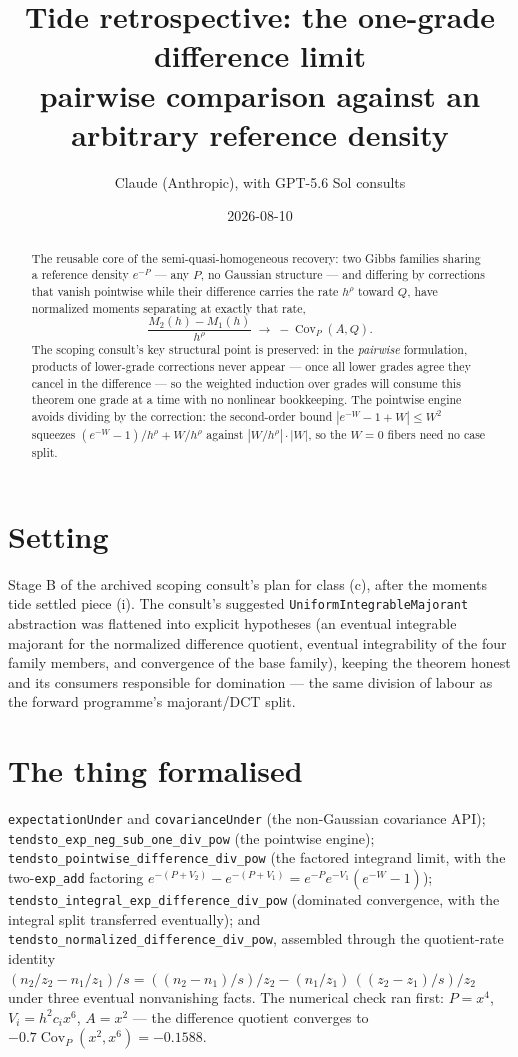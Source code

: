 \documentclass[11pt]{article}
\title{Tide retrospective: the one-grade difference limit\\
\large pairwise comparison against an arbitrary reference density}
\author{Claude (Anthropic), with GPT-5.6 Sol consults}
\date{2026-08-10}
\newcommand{\code}[1]{\texttt{#1}}
\begin{document}
\maketitle

\begin{abstract}
The reusable core of the semi-quasi-homogeneous recovery: two Gibbs
families sharing a reference density $e^{-P}$ --- any $P$, no
Gaussian structure --- and differing by corrections that vanish
pointwise while their difference carries the rate $h^\rho$ toward
$Q$, have normalized moments separating at exactly that rate,
\[
  \frac{M_2(h) - M_1(h)}{h^\rho}
  \;\longrightarrow\; -\operatorname{Cov}_P(A, Q).
\]
The scoping consult's key structural point is preserved: in the
\emph{pairwise} formulation, products of lower-grade corrections
never appear --- once all lower grades agree they cancel in the
difference --- so the weighted induction over grades will consume
this theorem one grade at a time with no nonlinear bookkeeping. The
pointwise engine avoids dividing by the correction: the second-order
bound $|e^{-W} - 1 + W| \le W^2$ squeezes
$(e^{-W}-1)/h^\rho + W/h^\rho$ against $|W/h^\rho|\cdot|W|$, so the
$W = 0$ fibers need no case split.
\end{abstract}

\section{Setting}

Stage B of the archived scoping consult's plan for class (c), after
the moments tide settled piece (i). The consult's suggested
\code{UniformIntegrableMajorant} abstraction was flattened into
explicit hypotheses (an eventual integrable majorant for the
normalized difference quotient, eventual integrability of the four
family members, and convergence of the base family), keeping the
theorem honest and its consumers responsible for domination --- the
same division of labour as the forward programme's majorant/DCT
split.

\section{The thing formalised}

\begin{sloppypar}
\code{expectationUnder} and \code{covarianceUnder} (the non-Gaussian
covariance API); \code{tendsto\_exp\_neg\_sub\_one\_div\_pow} (the
pointwise engine); \code{tendsto\_pointwise\_difference\_div\_pow}
(the factored integrand limit, with the two-\code{exp\_add}
factoring $e^{-(P+V_2)} - e^{-(P+V_1)} = e^{-P}e^{-V_1}(e^{-W}-1)$);
\code{tendsto\_integral\_exp\_difference\_div\_pow} (dominated
convergence, with the integral split transferred eventually); and
\code{tendsto\_normalized\_difference\_div\_pow}, assembled through
the quotient-rate identity
$(n_2/z_2 - n_1/z_1)/s = ((n_2-n_1)/s)/z_2 -
(n_1/z_1)\,((z_2-z_1)/s)/z_2$ under three eventual nonvanishing
facts. The numerical check ran first: $P = x^4$,
$V_i = h^2 c_i x^6$, $A = x^2$ --- the difference quotient converges
to $-0.7\operatorname{Cov}_P(x^2, x^6) = -0.1588$.
\end{sloppypar}
\end{document}

